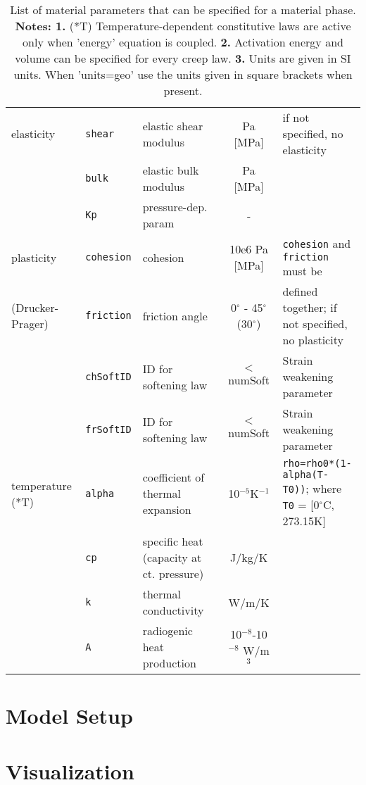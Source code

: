 \documentclass[a4paper,11pt]{article}
\begin{document}
\begin{table}[H]
\begin{center}
{\begin{tabular}{p{2.7cm} p{2cm} p{3cm} c p{5cm}}
\hdashline
elasticity&\texttt{shear}&elastic shear modulus&Pa [MPa]&if not specified, no elasticity\\
&\texttt{bulk}&elastic bulk modulus&Pa [MPa]&\\
&\texttt{Kp}&pressure-dep. param&-&\\

\hdashline
plasticity &\texttt{cohesion}&cohesion&10e6 Pa [MPa]&\texttt{cohesion} and \texttt{friction} must be \\
(Drucker-Prager)&\texttt{friction}&friction angle&0$^\circ$ - 45$^\circ$ (30$^\circ$)&defined together; if not specified, no plasticity\\
&\texttt{chSoftID}&ID for softening law&$<$ numSoft&Strain weakening parameter\\
&\texttt{frSoftID}&ID for softening law&$<$ numSoft&Strain weakening parameter\\


\hdashline
temperature  (*T)&\texttt{alpha}&coefficient of thermal expansion&10$^{-5}$K$^{-1}$&\texttt{rho=rho0*(1-alpha(T-T0))}; where \texttt{T0} = [0$^\circ$C, 273.15K]\\
&\texttt{cp}&specific heat (capacity at ct. pressure)&J/kg/K&\\
&\texttt{k}&thermal conductivity&W/m/K&\\
&\texttt{A}&radiogenic heat production&10$^{-8}$-10$^{-8}$ W/m$^3$ &\\

 \hline
     \end{tabular}
     }
  \caption{List of material parameters that can be specified for a material phase. \textbf{Notes: 1.} (*T) Temperature-dependent constitutive laws are active only when 'energy' equation is coupled. \textbf{2.} Activation energy and volume can be specified for every creep law. \textbf{3.} Units are given in SI units. When 'units=geo' use the units given in square brackets when present. }
  \label{tab:matprops}
  \end{center}
\end{table}

\section{Model Setup}
\label{sec:modelsetup}

\section{Visualization}



\end{document}
